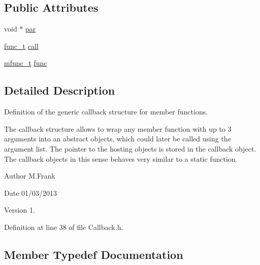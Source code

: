\subsection*{Public Attributes}
\begin{DoxyCompactItemize}
\item 
void $\ast$ \hyperlink{class_d_d4hep_1_1_callback_a0a6ca86dc357627c3c8e9f6233444733}{par}
\item 
\hyperlink{class_d_d4hep_1_1_callback_a1f07e4c890067fde0b3ff1ad94e72a34}{func\+\_\+t} \hyperlink{class_d_d4hep_1_1_callback_af278c88d3680465912b88ad74b0d4cff}{call}
\item 
\hyperlink{struct_d_d4hep_1_1_callback_1_1mfunc__t}{mfunc\+\_\+t} \hyperlink{class_d_d4hep_1_1_callback_a9998721dd74f6377d4c5e71629411426}{func}
\end{DoxyCompactItemize}


\subsection{Detailed Description}
Definition of the generic callback structure for member functions. 

The callback structure allows to wrap any member function with up to 3 arguments into an abstract objects, which could later be called using the argument list. The pointer to the hosting objects is stored in the callback object. The callback objects in this sense behaves very similar to a static function.

\begin{DoxyAuthor}{Author}
M.\+Frank 
\end{DoxyAuthor}
\begin{DoxyDate}{Date}
01/03/2013 
\end{DoxyDate}
\begin{DoxyVersion}{Version}
1. 
\end{DoxyVersion}


Definition at line 38 of file Callback.\+h.



\subsection{Member Typedef Documentation}
\hypertarget{class_d_d4hep_1_1_callback_a1f07e4c890067fde0b3ff1ad94e72a34}{}\label{class_d_d4hep_1_1_callback_a1f07e4c890067fde0b3ff1ad94e72a34} 
